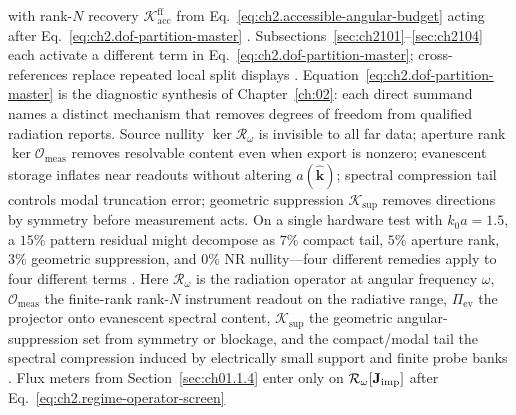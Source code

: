 with rank-$N$ recovery \(\mathcal{K}_{\mathrm{acc}}^{\mathrm{ff}}\) from
Eq.~\eqref{eq:ch2.accessible-angular-budget} acting after Eq.~\eqref{eq:ch2.dof-partition-master}
\cite{stratton1941}. Subsections~\ref{sec:ch2101}--\ref{sec:ch2104} each activate a
different term in Eq.~\eqref{eq:ch2.dof-partition-master}; cross-references replace repeated
local split displays \cite{stratton1941}.
Equation~\eqref{eq:ch2.dof-partition-master} is the diagnostic synthesis of
Chapter~\ref{ch:02}: each direct summand names a distinct mechanism that removes
degrees of freedom from qualified radiation reports. Source nullity
\(\ker\mathcal{R}_\omega\) is invisible to all far data; aperture rank
\(\ker\mathcal{O}_{\mathrm{meas}}\) removes resolvable content even when export
is nonzero; evanescent storage inflates near readouts without altering
\(a(\widehat{\mathbf{k}})\); spectral compression tail controls modal truncation
error; geometric suppression \(\mathcal{K}_{\mathrm{sup}}\) removes directions
by symmetry before measurement acts. On a single hardware test with \(k_0 a=1.5\),
a \(15\%\) pattern residual might decompose as \(7\%\) compact tail, \(5\%\) aperture
rank, \(3\%\) geometric suppression, and \(0\%\) NR nullity---four different remedies
apply to four different terms \cite{stratton1941}.
Here $\mathcal{R}_\omega$ is the radiation operator at angular frequency $\omega$,
$\mathcal{O}_{\mathrm{meas}}$ the finite-rank rank-$N$ instrument readout on the radiative range,
$\Pi_{\mathrm{ev}}$ the projector onto evanescent spectral content,
$\mathcal{K}_{\mathrm{sup}}$ the geometric angular-suppression set from symmetry or blockage,
and the compact/modal tail the spectral compression induced by electrically small support and
finite probe banks \cite{stratton1941}. Flux meters from Section~\ref{sec:ch01.1.4} enter only on
\(\mathcal{R}_\omega[\mathbf{J}_{\mathrm{imp}}]\) after Eq.~\eqref{eq:ch2.regime-operator-screen}
